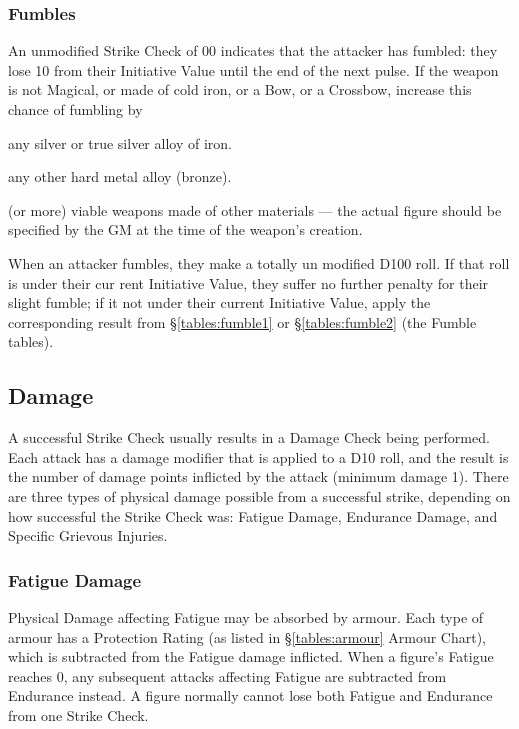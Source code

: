 \begin{multicols*}{3}
\subsubsection{Fumbles}
\label{combat:fumbles}

An unmodified Strike Check of 00 indicates that the attacker has
fumbled: they lose 10 from their Initiative Value until the end of the
next pulse. If the weapon is not Magical, or made of cold iron, or a
Bow, or a Crossbow, increase this chance of fumbling by
\begin{Description}
\item[1\%] any silver or true silver alloy of iron.
\item[2\%] any other hard metal alloy (\eg bronze).
\item[3\%] (or more) viable weapons made of other materials ---
the actual figure should be specified by the GM at the time of the
weapon's creation.
\end{Description}
When an attacker fumbles, they make a totally un modified D100
roll. If that roll is under their cur rent Initiative Value, they
suffer no further penalty for their slight fumble; if it not under
their current Initiative Value, apply the corresponding result from
\S\ref{tables:fumble1} or \S\ref{tables:fumble2} (the Fumble tables).

\subsection{Damage}
\label{combat:damage}

A successful Strike Check usually results in a Damage Check being
performed. Each attack has a damage modifier that is applied to a D10
roll, and the result is the number of damage points inflicted by the
attack (minimum damage 1). There are three types of physical damage
possible from a successful strike, depending on how successful the
Strike Check was: Fatigue Damage, Endurance Damage, and Specific
Grievous Injuries.

\subsubsection{Fatigue Damage}

Physical Damage affecting Fatigue may be absorbed by armour. Each type
of armour has a Protection Rating (as listed in \S \ref{tables:armour}
Armour Chart), which is subtracted from the Fatigue damage
inflicted. When a figure's Fatigue reaches 0, any subsequent attacks
affecting Fatigue are subtracted from Endurance instead. A figure
normally cannot lose both Fatigue and Endurance from one Strike Check.


\end{multicols*}
